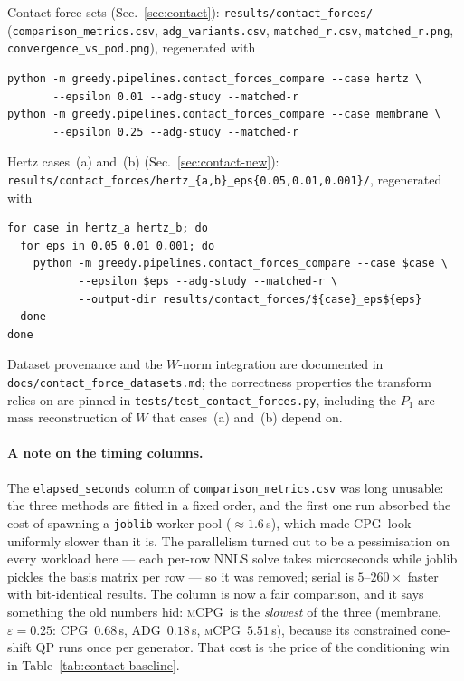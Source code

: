 \documentclass[11pt]{article}
\newcommand{\CPG}{\textsc{CPG}}
\newcommand{\ADG}{\textsc{ADG}}
\newcommand{\mCPG}{\textsc{mCPG}}
\begin{document}
Contact-force sets (Sec.~\ref{sec:contact}): \texttt{results/contact\_forces/}
(\texttt{comparison\_metrics.csv}, \texttt{adg\_variants.csv},
\texttt{matched\_r.csv}, \texttt{matched\_r.png},
\texttt{convergence\_vs\_pod.png}), regenerated with
\begin{verbatim}
python -m greedy.pipelines.contact_forces_compare --case hertz \
       --epsilon 0.01 --adg-study --matched-r
python -m greedy.pipelines.contact_forces_compare --case membrane \
       --epsilon 0.25 --adg-study --matched-r
\end{verbatim}
Hertz cases~(a) and~(b) (Sec.~\ref{sec:contact-new}):
\texttt{results/contact\_forces/hertz\_\{a,b\}\_eps\{0.05,0.01,0.001\}/},
regenerated with
\begin{verbatim}
for case in hertz_a hertz_b; do
  for eps in 0.05 0.01 0.001; do
    python -m greedy.pipelines.contact_forces_compare --case $case \
           --epsilon $eps --adg-study --matched-r \
           --output-dir results/contact_forces/${case}_eps${eps}
  done
done
\end{verbatim}
Dataset provenance and the $W$-norm integration are documented in
\texttt{docs/contact\_force\_datasets.md}; the correctness properties the
transform relies on are pinned in \texttt{tests/test\_contact\_forces.py},
including the $P_1$ arc-mass reconstruction of $W$ that cases~(a) and~(b) depend
on.

\paragraph{A note on the timing columns.}
The \texttt{elapsed\_seconds} column of \texttt{comparison\_metrics.csv} was
long unusable: the three methods are fitted in a fixed order, and the first one
run absorbed the cost of spawning a \texttt{joblib} worker pool
($\approx1.6$\,s), which made \CPG\ look uniformly slower than it is. The
parallelism turned out to be a pessimisation on every workload here --- each
per-row NNLS solve takes microseconds while joblib pickles the basis matrix per
row --- so it was removed; serial is $5$--$260\times$ faster with bit-identical
results. The column is now a fair comparison, and it says something the old
numbers hid: \mCPG\ is the \emph{slowest} of the three (membrane, $\varepsilon=0.25$:
\CPG\ $0.68$\,s, \ADG\ $0.18$\,s, \mCPG\ $5.51$\,s), because its constrained
cone-shift QP runs once per generator. That cost is the price of the
conditioning win in Table~\ref{tab:contact-baseline}.
\end{document}
